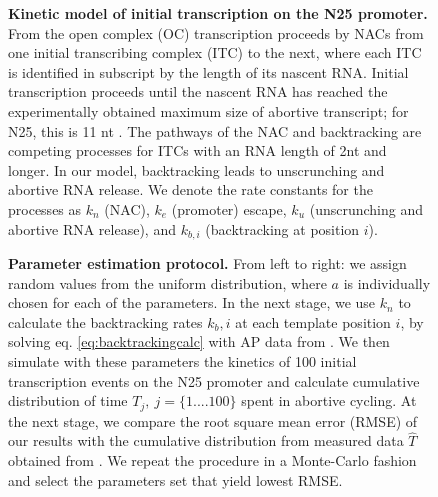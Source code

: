 \documentclass{bmcart}
\begin{document}
\begin{backmatter}
\begin{figure}[h!]
    \begin{center}
    \end{center}
  \caption{{\bf Kinetic model of initial transcription on the N25 promoter.}
    From the open complex (OC) transcription proceeds by NACs from one initial
    transcribing complex (ITC) to the next, where each ITC is identified in
    subscript by the length of its nascent RNA. Initial transcription proceeds
    until the nascent RNA has reached the experimentally obtained maximum size
    of abortive transcript; for N25, this is 11 nt \cite{hsu_initial_2006}.
    The pathways of the NAC and backtracking are competing processes for ITCs
    with an RNA length of 2nt and longer. In our model, backtracking leads to
    unscrunching and abortive RNA release. We denote the rate constants for
    the processes as $k_n$ (NAC), $k_e$ (promoter)
    escape, $k_u$ (unscrunching and abortive RNA release), and $k_{b,i}$ 
    (backtracking at position $i$).}
    \label{fig:model_and_rates}
\end{figure}

\begin{figure}[h!]
    \begin{center}
    \end{center}
  \caption{ {\bf Parameter estimation protocol.}
    From left to right: we assign random values from the uniform distribution,
    where $a$ is individually chosen for each of the parameters. In the next
    stage, we use $k_n$ to calculate the backtracking rates $k_b,i$ at each
    template position $i$, by solving eq. \ref{eq:backtrackingcalc} with AP
    data from \cite{hsu_initial_2006}. We then simulate with these parameters
    the kinetics of 100 initial transcription events on the N25 promoter 
    and calculate cumulative distribution of time $T_j,\ j=\{1....100\}$ spent
    in abortive cycling. At the next stage, we compare the root square mean
    error (RMSE) of our results with the cumulative distribution from measured
    data $\hat T$ obtained from \cite{revyakin_abortive_2006}. We repeat the
    procedure in a Monte-Carlo fashion and select the parameters set that
    yield lowest RMSE.}
    \label{fig:param_estimation_scheme}
\end{figure}


\end{backmatter}
\end{document}
